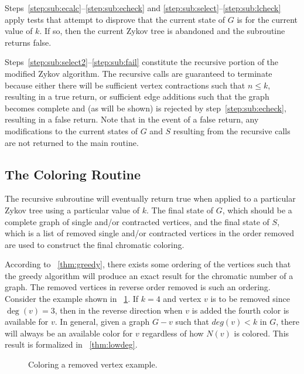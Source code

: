 Steps~\ref{step:sub:ecalc}--\ref{step:sub:echeck} and \ref{step:sub:select}--\ref{step:sub:lcheck} apply tests
that attempt to disprove that the current state of \(G\) is  for the current value of \(k\).  If so,
then the current Zykov tree is abandoned and the subroutine returns false.

Steps~\ref{step:sub:select2}--\ref{step:sub:fail} constitute the recursive portion of the modified Zykov algorithm.
The recursive calls are guaranteed to terminate because either there will be sufficient vertex contractions such
that \(n\le k\), resulting in a true return, or sufficient edge additions such that the graph becomes complete and
(as will be shown) is rejected by step~\ref{step:sub:echeck}, resulting in a false return.  Note that in the event
of a false return, any modifications to the current states of \(G\) and \(S\) resulting from the recursive calls
are not returned to the main routine.

\subsection{The Coloring Routine}\label{sec:sub:coloring}

The recursive subroutine will eventually return true when applied to a particular Zykov tree using a particular
value of \(k\).  The final state of \(G\), which should be a complete graph of single and/or contracted vertices,
and the final state of \(S\), which is a list of removed single and/or contracted vertices in the order removed are
used to construct the final chromatic coloring.

According to \theoremname~\ref{thm:greedy}, there exists some ordering of the vertices such that the greedy algorithm
will produce an exact result for the chromatic number of a graph.  The removed vertices in reverse order removed is
such an ordering.  Consider the example shown in \figurename~\ref{fig:reverse}.  If \(k=4\) and vertex \(v\) is to
be removed since \(\deg(v)=3\), then in the reverse direction when \(v\) is added the fourth color is available for
\(v\).  In general, given a graph \(G-v\) such that \(deg(v)<k\) in \(G\), there will always be an available color
for \(v\) regardless of how \(N(v)\) is colored.  This result is formalized in \theoremname~\ref{thm:lowdeg}.

\begin{figure}[H]
  \centering
  \caption{Coloring a removed vertex example.}
  \label{fig:reverse}
\end{figure}

